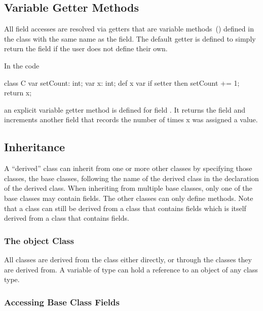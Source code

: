\subsection{Variable Getter Methods}
\label{Getter_Methods}

All field accesses are resolved via getters that are variable
methods~() defined in the class with the same
name as the field.  The default getter is defined to simply return the
field if the user does not define their own.

\begin{example}
In the code
\begin{chapel}
class C {
  var setCount: int;
  var x: int;
  def x var {
    if setter then
      setCount += 1;
    return x;
  }
}
\end{chapel}
an explicit variable getter method is defined for field .  It
returns the field  and increments another field that records
the number of times x was assigned a value.
\end{example}

\subsection{Inheritance}
\label{Inheritance}

A ``derived'' class can inherit from one or more other classes by
specifying those classes, the base classes, following the name of the
derived class in the declaration of the derived class.  When
inheriting from multiple base classes, only one of the base classes
may contain fields.  The other classes can only define methods.  Note
that a class can still be derived from a class that contains fields
which is itself derived from a class that contains fields.
\subsubsection{The object Class}
\label{The_object_Class}

All classes are derived from the  class either directly, or
through the classes they are derived from. A variable of type 
can hold a reference to an object of any class type. 

\subsubsection{Accessing Base Class Fields}
\label{Accessing_Base_Class_Fields}

